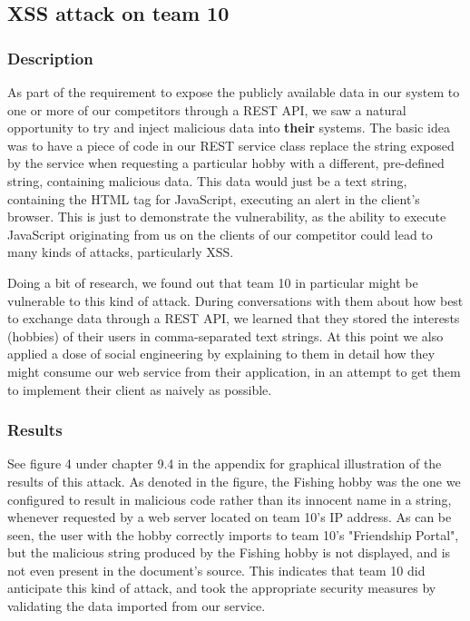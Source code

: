\documentclass[a4paper]{article}
\begin{document}


\subsection{XSS attack on team 10}
\subsubsection{Description}
As part of the requirement to expose the publicly available data in our system to one or more of our competitors through a REST API, we saw a natural opportunity to try and inject malicious data into \textbf{their} systems. The basic idea was to have a piece of code in our REST service class replace the string exposed by the service when requesting a particular hobby with a different, pre-defined string, containing malicious data. This data would just be a text string, containing the HTML tag for JavaScript, executing an alert in the client's browser. This is just to demonstrate the vulnerability, as the ability to execute JavaScript originating from us on the clients of our competitor could lead to many kinds of attacks, particularly XSS.

Doing a bit of research, we found out that team 10 in particular might be vulnerable to this kind of attack. During conversations with them about how best to exchange data through a REST API, we learned that they stored the interests (hobbies) of their users in comma-separated text strings. At this point we also applied a dose of social engineering by explaining to them in detail how they might consume our web service from their application, in an attempt to get them to implement their client as naively as possible.


\subsubsection{Results}
See figure 4 under chapter 9.4 in the appendix for graphical illustration of the results of this attack. As denoted in the figure, the Fishing hobby was the one we configured to result in malicious code rather than its innocent name in a string, whenever requested by a web server located on team 10's IP address. As can be seen, the user with the hobby correctly imports to team 10's "Friendship Portal", but the malicious string produced by the Fishing hobby is not displayed, and is not even present in the document's source. This indicates that team 10 did anticipate this kind of attack, and took the appropriate security measures by validating the data imported from our service.
\end{document}
